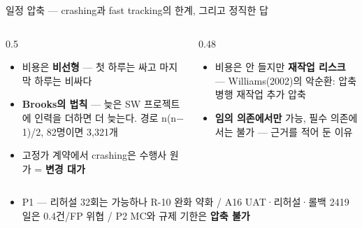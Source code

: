 \begin{frame}{일정 압축 — crashing과 fast tracking의 한계, 그리고 정직한 답}
\begin{columns}[T]
\begin{column}{0.5\textwidth}
\begin{itemize}
\item 비용은 \textbf{비선형} — 첫 하루는 싸고 마지막 하루는 비싸다
\item \textbf{Brooks의 법칙} — 늦은 SW 프로젝트에 인력을 더하면 더 늦는다. 경로 n(n$-$1)/2, 82명이면 3,321개
\item 고정가 계약에서 crashing은 수행사 원가 = \textbf{변경 대가}
\end{itemize}
\end{column}
\begin{column}{0.48\textwidth}
\begin{itemize}
\item 비용은 안 들지만 \textbf{재작업 리스크} — Williams(2002)의 악순환: 압축 \ra{} 병행 \ra{} 재작업 \ra{} 추가 압축
\item \textbf{임의 의존에서만} 가능, 필수 의존에서는 불가 — 근거를 적어 둔 이유
\end{itemize}
\end{column}
\end{columns}
\begin{itemize}
\item P1 — 리허설 3\ra{}2회는 가능하나 R-10 완화 약화 / A16 UAT·리허설·롤백 24\ra{}19일은 0.4건/FP 위협 / P2 MC와 규제 기한은 \textbf{압축 불가}
\end{itemize}
\end{frame}

